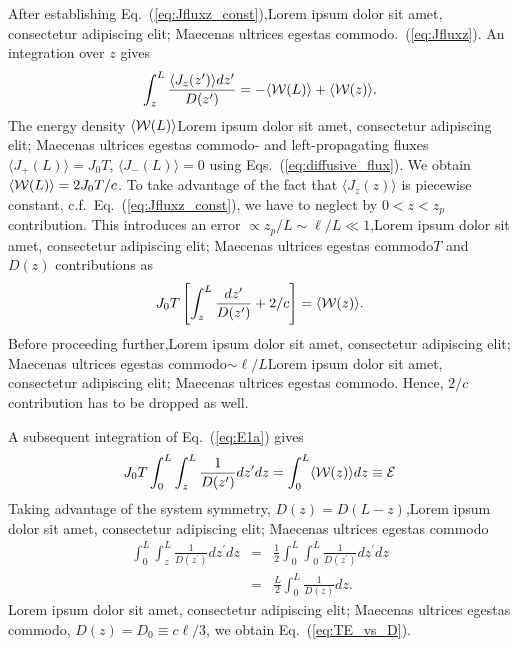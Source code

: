 After establishing Eq.~(\ref{eq:Jfluxz_const}),Lorem ipsum dolor sit amet, consectetur adipiscing elit; Maecenas ultrices egestas commodo.~(\ref{eq:Jfluxz}). An integration over $z$ gives
\begin{equation}
\displaystyle\int_z^L\frac{\langle J_z(z^\prime)\rangle dz^\prime}{D(z^\prime)}=-\langle {\cal W}(L)\rangle + \langle {\cal W}(z)\rangle.
\label{eq:E1}
\end{equation}
The energy density $\langle {\cal W}(L)\rangle$Lorem ipsum dolor sit amet, consectetur adipiscing elit; Maecenas ultrices egestas commodo- and left-propagating fluxes $\langle J_+(L)\rangle=J_0T$, $\langle J_-(L)\rangle=0$ using Eqs.~(\ref{eq:diffusive_flux}). We obtain $\langle {\cal W}(L)\rangle=2J_0T/c$. To take advantage of the fact that $\langle J_z(z)\rangle$ is piecewise constant, c.f.~Eq.~(\ref{eq:Jfluxz_const}), we have to neglect by $0<z<z_p$ contribution. This introduces an error $\propto z_p/L\sim\ell/L\ll 1$,Lorem ipsum dolor sit amet, consectetur adipiscing elit; Maecenas ultrices egestas commodo$T$ and $D(z)$ contributions as
\begin{equation}
J_0T\left[\displaystyle\int_z^L\frac{dz^\prime}{D(z^\prime)}+2/c\right]= \langle {\cal W}(z)\rangle.
\label{eq:E1a}
\end{equation}
Before proceeding further,Lorem ipsum dolor sit amet, consectetur adipiscing elit; Maecenas ultrices egestas commodo$\sim \ell/L$Lorem ipsum dolor sit amet, consectetur adipiscing elit; Maecenas ultrices egestas commodo. Hence, $2/c$ contribution has to be dropped as well.

A subsequent integration of Eq.~(\ref{eq:E1a}) gives 
\begin{equation}
J_0T\displaystyle\int_{0}^{L}\int_{z}^{L}\displaystyle\frac{1}{D(z^\prime)}dz^\prime dz=
\displaystyle\int_0^L \langle {\cal W}(z)\rangle dz
\equiv{\cal E}
\label{eq:E2}
\end{equation}
Taking advantage of the system symmetry, $D(z)=D(L-z)$,Lorem ipsum dolor sit amet, consectetur adipiscing elit; Maecenas ultrices egestas commodo
\begin{eqnarray}
\displaystyle\int_{0}^{L}\int_{z}^{L}\displaystyle\frac{1}{D(z^\prime)}dz^\prime dz &=&\frac{1}{2}\displaystyle\int_{0}^{L}\int_{0}^{L}\displaystyle\frac{1}{D(z^\prime)}dz^\prime dz \nonumber\\
&=&\frac{L}{2}\int_{0}^{L}\displaystyle\frac{1}{D(z)}dz.
\label{eq:E3}
\end{eqnarray}
Lorem ipsum dolor sit amet, consectetur adipiscing elit; Maecenas ultrices egestas commodo, $D(z)=D_0\equiv c\ell/3$, we obtain Eq.~(\ref{eq:TE_vs_D}).

